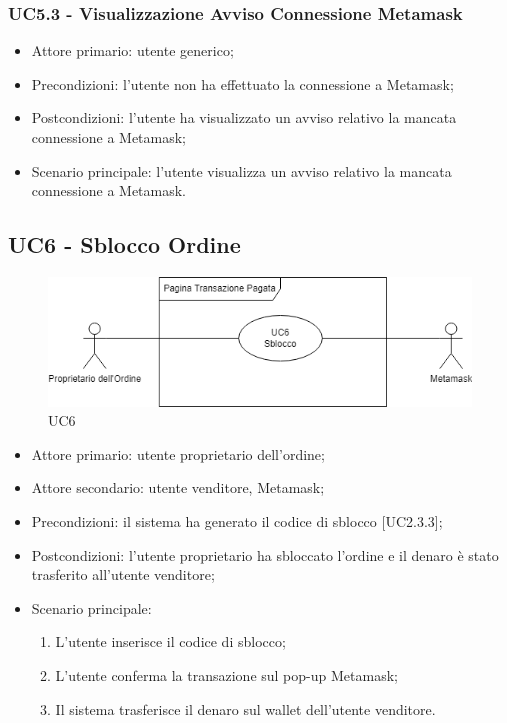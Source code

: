 \subsubsection{UC5.3 - Visualizzazione Avviso Connessione Metamask}

\begin{itemize}
    \item Attore primario: utente generico;
    \item Precondizioni: l'utente non ha effettuato la connessione a Metamask;
    \item Postcondizioni: l'utente ha visualizzato un avviso relativo la mancata connessione a Metamask;
    \item Scenario principale: l'utente visualizza un avviso relativo la mancata connessione a Metamask.
\end{itemize}

\subsection{UC6 - Sblocco Ordine}

\begin{figure}[H]
    \centering
    \includegraphics[scale=0.7]{immagini/UC6.png}
    \caption{UC6}
\end{figure}

\begin{itemize}
    \item Attore primario: utente proprietario dell'ordine;
    \item Attore secondario: utente venditore, Metamask\glo{};
    \item Precondizioni: il sistema ha generato il codice di sblocco [UC2.3.3];
    \item Postcondizioni: l'utente proprietario ha sbloccato l'ordine e il denaro è stato trasferito all'utente venditore;
    \item Scenario principale:
          \begin{enumerate}
              \item L'utente inserisce il codice di sblocco;
              \item L'utente conferma la transazione sul pop-up Metamask\glo{};
              \item Il sistema trasferisce il denaro sul wallet\glo{} dell'utente venditore.
          \end{enumerate}
\end{itemize}

